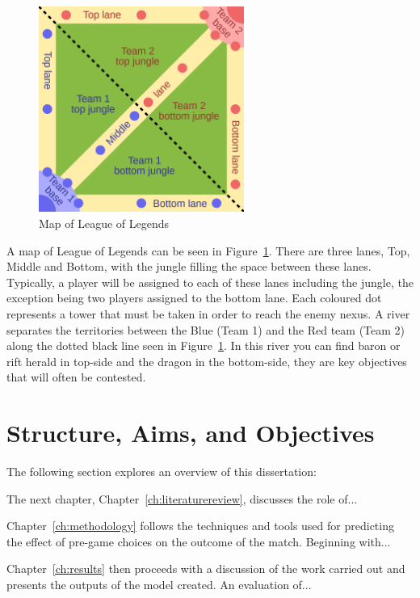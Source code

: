 \begin{figure}[h]
    \centering
    \includegraphics[width=0.6\textwidth]{figures/MOBAMap}
    \caption{Map of League of Legends}
    \label{fig:Lolmap}
\end{figure}

A map of League of Legends can be seen in Figure~\ref{fig:Lolmap}.
There are three lanes, Top, Middle and Bottom, with the \gls{jungle} filling the space between these lanes.
Typically, a player will be assigned to each of these lanes including the jungle, the exception being two players assigned to the bottom lane.
Each coloured dot represents a \gls{tower} that must be taken in order to reach the enemy \Gls{nexus}.
A river separates the territories between the Blue (Team 1) and the Red team (Team 2) along the dotted black line seen in Figure~\ref{fig:Lolmap}.
In this river you can find \Gls{baron} or \Gls{rift herald} in top-side and the \Gls{dragon} in the bottom-side, they are key objectives that will often be contested.




\section{Structure, Aims, and Objectives}\label{sec:Structure, Aims, and Objectives}

The following section explores an overview of this dissertation:

The next chapter, Chapter~\ref{ch:literaturereview}, discusses the role of...

Chapter~\ref{ch:methodology} follows the techniques and tools used for predicting the effect of pre-game choices on the outcome of the match.
Beginning with...


Chapter~\ref{ch:results} then proceeds with a discussion of the work
carried out and presents the outputs of the model created.
An evaluation of...


